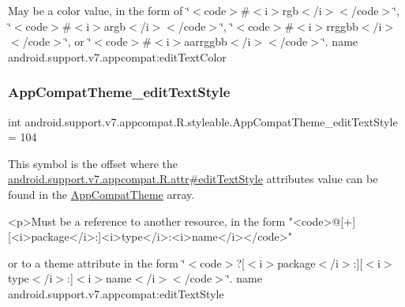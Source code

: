 May be a color value, in the form of \char`\"{}$<$code$>$\#$<$i$>$rgb$<$/i$>$$<$/code$>$\char`\"{}, \char`\"{}$<$code$>$\#$<$i$>$argb$<$/i$>$$<$/code$>$\char`\"{}, \char`\"{}$<$code$>$\#$<$i$>$rrggbb$<$/i$>$$<$/code$>$\char`\"{}, or \char`\"{}$<$code$>$\#$<$i$>$aarrggbb$<$/i$>$$<$/code$>$\char`\"{}.  name android.\+support.\+v7.\+appcompat\+:edit\+Text\+Color \mbox{\label{classandroid_1_1support_1_1v7_1_1appcompat_1_1R_1_1styleable_a61b6fb421253f208b594379481457a10}} 
\subsubsection{\texorpdfstring{App\+Compat\+Theme\+\_\+edit\+Text\+Style}{AppCompatTheme\_editTextStyle}}
{\footnotesize\ttfamily int android.\+support.\+v7.\+appcompat.\+R.\+styleable.\+App\+Compat\+Theme\+\_\+edit\+Text\+Style = 104\hspace{0.3cm}{\ttfamily [static]}}

This symbol is the offset where the \hyperlink{classandroid_1_1support_1_1v7_1_1appcompat_1_1R_1_1attr_a74d4dc05fa3ea797344808fee27b9ee2}{android.\+support.\+v7.\+appcompat.\+R.\+attr\#edit\+Text\+Style} attribute\textquotesingle{}s value can be found in the \hyperlink{classandroid_1_1support_1_1v7_1_1appcompat_1_1R_1_1styleable_a5c42f89e8a410c323be34208d75c430b}{App\+Compat\+Theme} array.

\begin{DoxyVerb}      <p>Must be a reference to another resource, in the form "<code>@[+][<i>package</i>:]<i>type</i>:<i>name</i></code>"
\end{DoxyVerb}
 or to a theme attribute in the form \char`\"{}$<$code$>$?\mbox{[}$<$i$>$package$<$/i$>$\+:\mbox{]}\mbox{[}$<$i$>$type$<$/i$>$\+:\mbox{]}$<$i$>$name$<$/i$>$$<$/code$>$\char`\"{}.  name android.\+support.\+v7.\+appcompat\+:edit\+Text\+Style \mbox{\label{classandroid_1_1support_1_1v7_1_1appcompat_1_1R_1_1styleable_a64e8a50c8e529ef52de9d6160eec4331}} 

